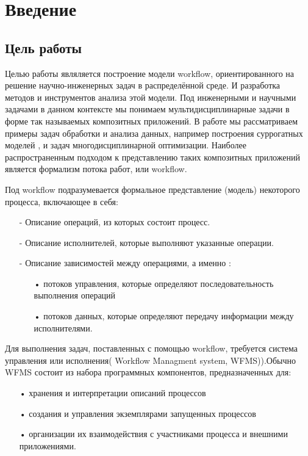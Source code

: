 \documentclass[a4paper,14pt]{article}
\begin{document}
\textwidth 15.5cm
\topmargin -1cm
\parindent 1cm
\textheight 24cm
\parskip 1.5mm



\section{Введение}
\subsection*{Цель работы}
Целью работы являляется построение модели workflow, ориентированного  на решение научно-инженерных задач в распределённой среде. И разработка методов и инструментов анализа этой модели.
 Под инженерными и научными задачами в данном контексте мы понимаем 
мультидисциплинарные задачи в форме так называемых композитных приложений. В работе мы рассматриваем примеры задач обработки и анализа данных, например построения  суррогатных моделей , и задач многодисциплинарной оптимизации. Наиболее распространенным подходом к представлению таких композитных приложений является формализм потока работ, или workflow.

Под workflow подразумевается формальное представление (модель) некоторого процесса, включающее в себя:
\begin{enumerate}
\item[-] Описание операций, из которых состоит процесс.
\item[-] Описание исполнителей, которые выполняют указанные операции.
\item[-] Описание зависимостей между операциями, а именно :
\begin{enumerate}
\item[•] потоков управления, которые определяют последовательность выполнения операций 
\item[•] потоков данных, которые
определяют передачу информации между исполнителями.
\end{enumerate}
\end{enumerate}


Для выполнения задач, поставленных с помощью workflow, требуется система управления или исполнения( Workflow Managment system, WFMS)).Обычно WFMS состоит из набора программных
компонентов, предназначенных для:
\begin{enumerate}
\item[•] хранения и интерпретации описаний
процессов 
\item[•] создания и управления экземплярами запущенных процессов
\item[•] организации их взаимодействия с участниками
процесса и внешними приложениями.
\end{enumerate}
\end{document}
